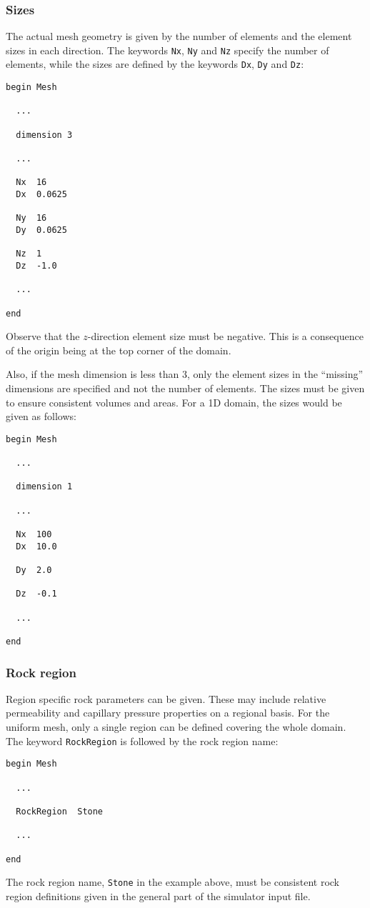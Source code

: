 \subsubsection{Sizes}
\label{sec:sizes}

The actual mesh geometry is given by the number of elements and the
element sizes in each direction. The keywords \texttt{Nx}, \texttt{Ny}
and \texttt{Nz} specify the number of elements, while the sizes are
defined by the keywords \texttt{Dx}, \texttt{Dy} and \texttt{Dz}:
%
\begin{verbatim}
begin Mesh

  ...

  dimension 3

  ...

  Nx  16
  Dx  0.0625

  Ny  16
  Dy  0.0625
	
  Nz  1
  Dz  -1.0 

  ...

end
\end{verbatim}
%
Observe that the $z$-direction element size must be negative. This is
a consequence of the origin being at the top corner of the domain.

Also, if the mesh dimension is less than 3, only the element sizes in
the ``missing'' dimensions are specified and not the number of
elements. The sizes must be given to ensure consistent volumes and
areas. For a 1D domain, the sizes would be given as follows:
%
\begin{verbatim}
begin Mesh

  ...

  dimension 1

  ...

  Nx  100
  Dx  10.0

  Dy  2.0

  Dz  -0.1

  ...

end
\end{verbatim}


\subsubsection{Rock region}
\label{sec:rock-region}

Region specific rock parameters can be given. These may include
relative permeability and capillary pressure properties on a regional
basis. For the uniform mesh, only a single region can be defined
covering the whole domain. The keyword \texttt{RockRegion} is followed
by the rock region name:
%
\begin{verbatim}
begin Mesh

  ...

  RockRegion  Stone

  ...

end
\end{verbatim}
%
The rock region name, \texttt{Stone} in the example above, must be
consistent rock region definitions given in the general part of the
simulator input file.

